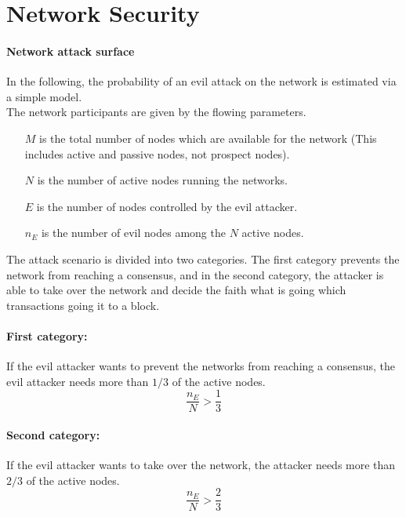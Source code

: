 \section{Network Security}
\paragraph{Network attack surface\\} 
In the following, the probability of an evil attack on the network is estimated via a simple model. \\
The network participants are given by the flowing parameters.\\
\begin{itemize}
 \item[$M$] is the total number of nodes which are available for the network (This includes active and passive nodes, not prospect nodes). 
\item[$N$] is the number of active nodes running the networks. 
\item[$E$] is the number of nodes controlled by the evil attacker. 
\item[$n_E$] is the number of evil nodes among the $N$ active nodes. 
 \end{itemize}

The attack scenario is divided into two categories. The first category prevents the network from reaching a consensus, and in the second category, the attacker is able to take over the network and decide the faith what is going which transactions going it to a block. \\
\paragraph{First category:\\}
If the evil attacker wants to prevent the networks from reaching a consensus, the evil attacker needs more than $1/3$ of the active nodes.
\begin{equation}
 \frac{n_E}{N} > \frac{1}{3}
\end{equation}

\paragraph{Second category:\\}
If the evil attacker wants to take over the network, the attacker needs more than $2/3$ of the active nodes.
\begin{equation}
 \frac{n_E}{N} > \frac{2}{3}
\end{equation}


